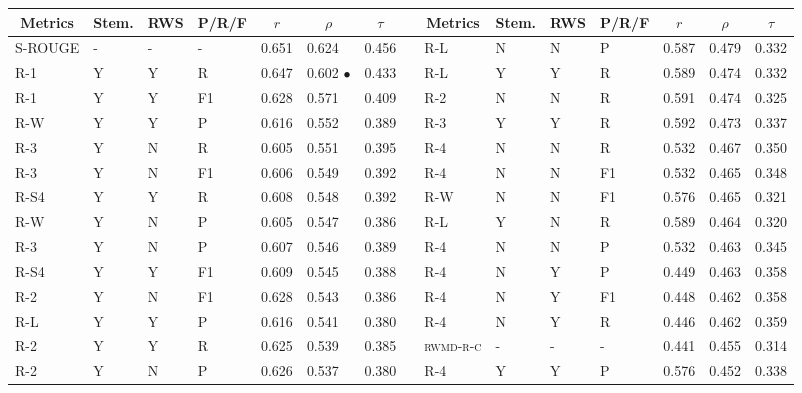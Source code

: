 \documentclass[11pt,a4paper]{article}
\begin{document}
\begin{table}[]
\centering
{
\scriptsize
\begin{tabular}{lllllllllllllll}
\hline
\multicolumn{1}{c}{Metrics} & \multicolumn{1}{c}{Stem.} & \multicolumn{1}{c}{RWS} & \multicolumn{1}{c}{P/R/F} & \multicolumn{1}{c}{$r$} & \multicolumn{1}{c}{$\rho$} & \multicolumn{1}{c}{$\tau$} & \multicolumn{1}{c}{} & \multicolumn{1}{c}{Metrics} & \multicolumn{1}{c}{Stem.} & \multicolumn{1}{c}{RWS} & \multicolumn{1}{c}{P/R/F} & \multicolumn{1}{c}{$r$} & \multicolumn{1}{c}{$\rho$} & \multicolumn{1}{c}{$\tau$} \\ \hline
\textsc{S-ROUGE} & - & - & - & 0.651 & 0.624 & 0.456 &  & \textsc{R-L} & N & N & P & 0.587 & 0.479 & 0.332 \\
\textsc{R-1} & Y & Y & R & 0.647 & 0.602 $\bullet$ & 0.433 &  & \textsc{R-L} & Y & Y & R & 0.589 & 0.474 & 0.332 \\
\textsc{R-1} & Y & Y & F1 & 0.628 & 0.571 & 0.409 &  & \textsc{R-2} & N & N & R & 0.591 & 0.474 & 0.325 \\
\textsc{R-W} & Y & Y & P & 0.616 & 0.552 & 0.389 &  & \textsc{R-3} & Y & Y & R & 0.592 & 0.473 & 0.337 \\
\textsc{R-3} & Y & N & R & 0.605 & 0.551 & 0.395 &  & \textsc{R-4} & N & N & R & 0.532 & 0.467 & 0.350 \\
\textsc{R-3} & Y & N & F1 & 0.606 & 0.549 & 0.392 &  & \textsc{R-4} & N & N & F1 & 0.532 & 0.465 & 0.348 \\
\textsc{R-S4} & Y & Y & R & 0.608 & 0.548 & 0.392 &  & \textsc{R-W} & N & N & F1 & 0.576 & 0.465 & 0.321 \\
\textsc{R-W} & Y & N & P & 0.605 & 0.547 & 0.386 &  & \textsc{R-L} & Y & N & R & 0.589 & 0.464 & 0.320 \\
\textsc{R-3} & Y & N & P & 0.607 & 0.546 & 0.389 &  & \textsc{R-4} & N & N & P & 0.532 & 0.463 & 0.345 \\
\textsc{R-S4} & Y & Y & F1 & 0.609 & 0.545 & 0.388 &  & \textsc{R-4} & N & Y & P & 0.449 & 0.463 & 0.358 \\
\textsc{R-2} & Y & N & F1 & 0.628 & 0.543 & 0.386 &  & \textsc{R-4} & N & Y & F1 & 0.448 & 0.462 & 0.358 \\
\textsc{R-L} & Y & Y & P & 0.616 & 0.541 & 0.380 &  & \textsc{R-4} & N & Y & R & 0.446 & 0.462 & 0.359 \\
\textsc{R-2} & Y & Y & R & 0.625 & 0.539 & 0.385 &  & \textsc{rwmd-r-c} & - & - & - & 0.441 & 0.455 & 0.314 \\
\textsc{R-2} & Y & N & P & 0.626 & 0.537 & 0.380 &  & \textsc{R-4} & Y & Y & P & 0.576 & 0.452 & 0.338 \\

\end{tabular}}
\end{table}
\end{document}
